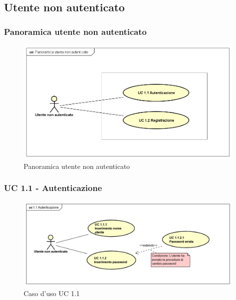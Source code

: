 \subsection{Utente non autenticato}
\subsubsection{Panoramica utente non autenticato}
\begin{figure}[H]
\centering
\includegraphics[width=17cm]{img/UC1.png} 
\caption{Panoramica utente non autenticato}\label{fig:1}
\end{figure}


\subsubsection{UC 1.1 - Autenticazione}

\begin{figure}[H]
\centering
\includegraphics[width=17cm]{img/UC11.png} 
\caption{Caso d'uso UC 1.1}
\end{figure}

